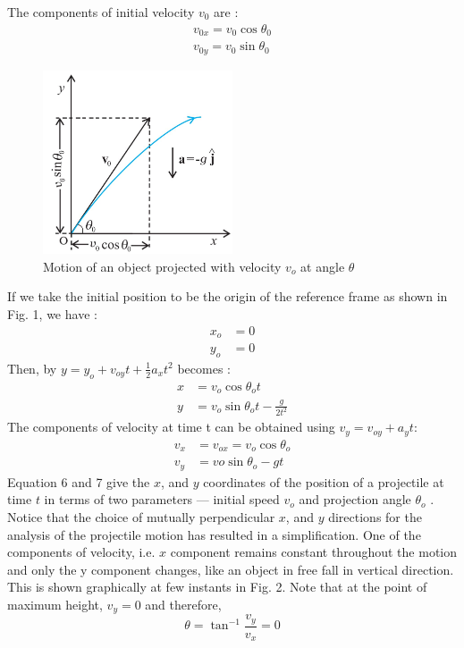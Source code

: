 \documentclass[12pt]{article}
\begin{document}
The components of initial velocity $v_0$ are :
\begin{align}
    v_{0x} = v_{0}\cos\theta_0 \\
    v_{0y} = v_{0}\sin\theta_0
\end{align}
\begin{figure}[H]
    \centering
    \includegraphics[width=0.5\textwidth]{fig1.JPG}
    \caption{Motion of an object projected with velocity $v_o$ at angle $\theta$ \cite{ref2}}
    \label{fig:fig1.JPEG}
\end{figure}
If we take the initial position to be the origin of the reference frame as shown in Fig. 1, we have : 
\begin{align*}
    x_o &= 0 \\
    y_o &= 0
\end{align*}
Then, by $y = y_o + v_{oy}t + \frac{1}{2}a_xt^2$ becomes : 
\begin{align}
x &= v_o \cos\theta_ot \\
y &= v_o \sin\theta_ot - \frac{g}{2t^2}    
\end{align}
The components of velocity at time t can be obtained using $v_y = v_{oy} + a_yt$:
\begin{align}
    v_x &= v_{ox} = v_o \cos \theta_o \\
    v_y &= vo \sin \theta_o - gt
\end{align}
Equation 6 and 7 give the $x$, and $y$ coordinates of the position of a projectile at time $t$ in terms of two parameters — initial speed $v_o$ and projection angle $\theta_o$ . Notice that the choice of mutually perpendicular $x$, and $y$ directions for the analysis of the projectile motion has resulted in a simplification. One of the components of velocity, i.e. $x$ component remains constant throughout the motion and only the y component changes, like an object in free fall in vertical direction. This is shown graphically at few instants in Fig. 2. Note that at the point of maximum height, $v_y = 0$ and therefore,
$$\theta = \tan^{-1} \frac{v_y}{v_x} = 0$$
\end{document}
